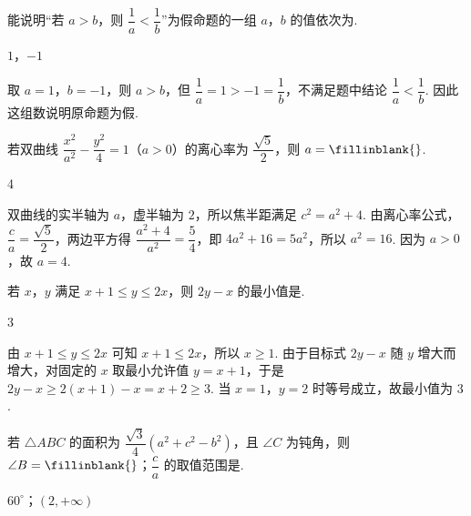 \begin{problem}
能说明“若 \(a>b\)，则 \(\dfrac1a<\dfrac1b\)”为假命题的一组 \(a\)，\(b\) 的值依次为\fillinblank{}.
\end{problem}

\begin{answer}
\(1\)，\(-1\)
\end{answer}

\begin{solution}
取 \(a=1\)，\(b=-1\)，则 \(a>b\)，但 \(\dfrac1a=1>-1=\dfrac1b\)，不满足题中结论 \(\dfrac1a<\dfrac1b\). 因此这组数说明原命题为假.
\end{solution}


\begin{problem}
若双曲线 \(\dfrac{x^2}{a^2}-\dfrac{y^2}{4}=1\)（\(a>0\)）的离心率为 \(\dfrac{\sqrt5}{2}\)，则 \(a=\fillinblank{}\).
\end{problem}

\begin{answer}
4
\end{answer}

\begin{solution}
双曲线的实半轴为 \(a\)，虚半轴为 \(2\)，所以焦半距满足 \(c^2=a^2+4\). 由离心率公式，\(\dfrac ca=\dfrac{\sqrt5}{2}\)，两边平方得 \(\dfrac{a^2+4}{a^2}=\dfrac54\)，即 \(4a^2+16=5a^2\)，所以 \(a^2=16\). 因为 \(a>0\)，故 \(a=4\).
\end{solution}


\begin{problem}
若 \(x\)，\(y\) 满足 \(x+1\le y\le2x\)，则 \(2y-x\) 的最小值是\fillinblank{}.
\end{problem}

\begin{answer}
3
\end{answer}

\begin{solution}
由 \(x+1\leq y\leq2x\) 可知 \(x+1\leq2x\)，所以 \(x\geq1\). 由于目标式 \(2y-x\) 随 \(y\) 增大而增大，对固定的 \(x\) 取最小允许值 \(y=x+1\)，于是 \(2y-x\geq2(x+1)-x=x+2\geq3\). 当 \(x=1\)，\(y=2\) 时等号成立，故最小值为 \(3\).
\end{solution}


\begin{problem}
若 \(\triangle ABC\) 的面积为 \(\dfrac{\sqrt3}{4}(a^2+c^2-b^2)\)，且 \(\angle C\) 为钝角，则 \(\angle B=\fillinblank{}\)；\(\dfrac ca\) 的取值范围是\fillinblank{}.
\end{problem}

\begin{answer}
\(60^\circ\)；\((2,+\infty)\)
\end{answer}

